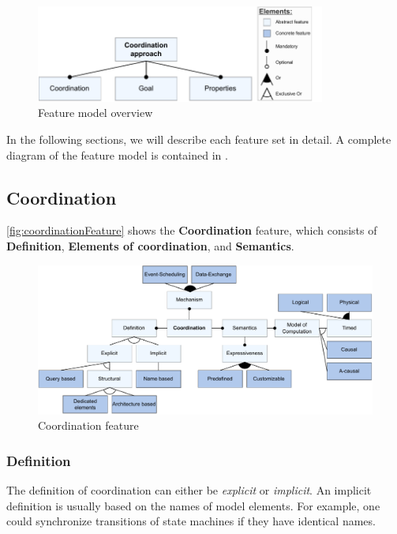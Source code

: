 \documentclass[runningheads]{llncs}
\begin{document}
\begin{figure}[ht]
	\centering
	\includegraphics[width=0.85\textwidth]{images/root}
	\caption{Feature model overview}
	\label{fig:featureModelOverview}
\end{figure}

In the following sections, we will describe each feature set in detail.
A complete diagram of the feature model is contained in \cite{timkrauterArtifactsCoordination2024}.

\subsection{Coordination}

\autoref{fig:coordinationFeature} shows the \textbf {Coordination} feature, which consists of \textbf{Definition}, \textbf{Elements of coordination}, and \textbf{Semantics}.

\begin{figure}[ht]
	\centering
	\includegraphics[width=1\textwidth]{images/coordination_feature}
	\caption{Coordination feature}
	\label{fig:coordinationFeature}
\end{figure}

\subsubsection{Definition} The definition of coordination can either be \textit{explicit} or \textit{implicit}.
An implicit definition is usually based on the names of model elements.
For example, one could synchronize transitions of state machines if they have identical names.
\end{document}
